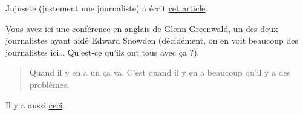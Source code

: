 Jujusete (justement une journaliste) a écrit
\href{http://seteici.ondule.fr/2013/05/emails-sortez-couverts/}{cet article}.

Vous avez
\href{https://www.ted.com/talks/glenn_greenwald_why_privacy_matters}{ici}
une conférence en anglais de Glenn Greenwald, un des deux journalistes
ayant aidé Edward Snowden (décidément, on en voit beaucoup des
journalistes ici\ldots{} Qu'est-ce qu'ils ont tous avec ça ?).

\begin{quote}
Quand il y en a un ça va. C'est quand il y en a beaucoup qu'il y a des
problèmes.
\end{quote}

Il y a aussi \href{http://www.uzine.net/article128.html}{ceci}.